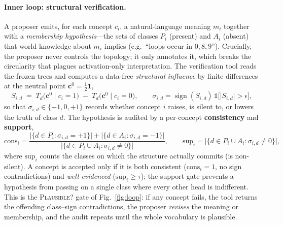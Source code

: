 \paragraph{Inner loop: structural verification.}
A proposer emits, for each concept $c_i$, a natural-language meaning $m_i$ together
with a \emph{membership hypothesis}---the sets of classes $P_i$ (present) and $A_i$
(absent) that world knowledge about $m_i$ implies (e.g.\ ``loops occur in
$0,8,9$''). Crucially, the proposer never controls the topology; it only annotates
it, which breaks the circularity that plagues activation-only interpretation. The
verification tool reads the frozen trees and computes a data-free
\emph{structural influence} by finite differences at the neutral point
$\mathbf{c}^0=\tfrac12\mathbf{1}$,
\begin{equation}
S_{i,d} \;=\; T_d\big(\mathbf{c}^0\!\mid c_i{=}1\big)\;-\;T_d\big(\mathbf{c}^0\!\mid c_i{=}0\big),
\qquad
\sigma_{i,d}=\operatorname{sign}(S_{i,d})\,\mathbb{1}\!\big[\lvert S_{i,d}\rvert>\epsilon\big],
\end{equation}
so that $\sigma_{i,d}\in\{-1,0,+1\}$ records whether concept $i$ raises, is silent
to, or lowers the truth of class $d$. The hypothesis is audited by a per-concept
\textbf{consistency} and \textbf{support},
\begin{equation}
\mathrm{cons}_i=\frac{\big|\{d\in P_i:\sigma_{i,d}{=}{+}1\}\big|+\big|\{d\in A_i:\sigma_{i,d}{=}{-}1\}\big|}
{\big|\{d\in P_i\cup A_i:\sigma_{i,d}\neq0\}\big|},
\qquad
\mathrm{sup}_i=\big|\{d\in P_i\cup A_i:\sigma_{i,d}\neq0\}\big|,
\end{equation}
where $\mathrm{sup}_i$ counts the classes on which the structure actually commits
(is non-silent). A concept is accepted only if it is both consistent
($\mathrm{cons}_i=1$, no sign contradictions) and \emph{well-evidenced}
($\mathrm{sup}_i\ge\tau$); the support gate prevents a hypothesis from passing on a
single class where every other head is indifferent. This is the \textsc{Plausible?}
gate of Fig.~\ref{fig:loop}: if any concept fails, the tool returns the offending
class--sign contradictions, the proposer \emph{revises} the meaning or membership,
and the audit repeats until the whole vocabulary is plausible.

